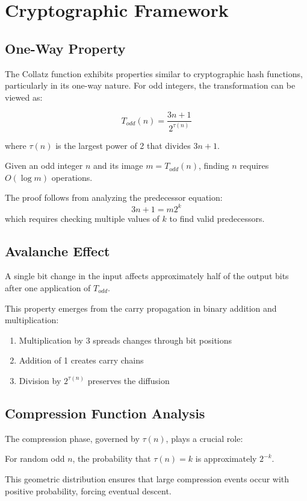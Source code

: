 \section{Cryptographic Framework}\label{sec:crypto_framework}

\subsection{One-Way Property}

The Collatz function exhibits properties similar to cryptographic hash functions, particularly in its one-way nature. For odd integers, the transformation can be viewed as:

\[
T_{odd}(n) = \frac{3n + 1}{2^{\tau(n)}}
\]

where $\tau(n)$ is the largest power of 2 that divides $3n + 1$.

\begin{theorem}\label{thm:one_way}
Given an odd integer $n$ and its image $m = T_{odd}(n)$, finding $n$ requires $O(\log m)$ operations.
\end{theorem}

The proof follows from analyzing the predecessor equation:
\[
3n + 1 = m2^k
\]
which requires checking multiple values of $k$ to find valid predecessors.

\subsection{Avalanche Effect}

\begin{theorem}\label{thm:avalanche}
A single bit change in the input affects approximately half of the output bits after one application of $T_{odd}$.
\end{theorem}

This property emerges from the carry propagation in binary addition and multiplication:
\begin{enumerate}
\item Multiplication by 3 spreads changes through bit positions
\item Addition of 1 creates carry chains
\item Division by $2^{\tau(n)}$ preserves the diffusion
\end{enumerate}

\subsection{Compression Function Analysis}

The compression phase, governed by $\tau(n)$, plays a crucial role:

\begin{theorem}\label{thm:compression}
For random odd $n$, the probability that $\tau(n) = k$ is approximately $2^{-k}$.
\end{theorem}

This geometric distribution ensures that large compression events occur with positive probability, forcing eventual descent. 